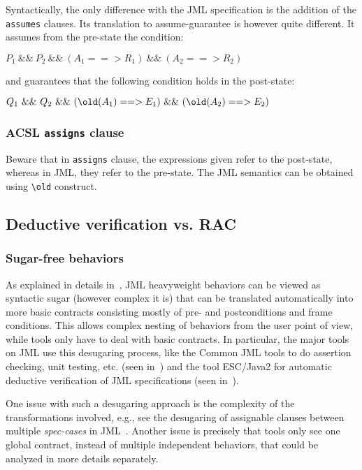 \noindent
Syntactically, the only difference with the JML specification is the
addition of the \verb|assumes| clauses.
Its translation to assume-guarantee is however quite different. 
It assumes from the pre-state the condition:

\begin{center}
{\ttfamily $P_1 ~\&\&~ P_2 ~\&\&~ 
  (A_1 ==> R_1) ~\&\&~ (A_2 ==> R_2)$}
\end{center}

\noindent
and guarantees that the following condition holds in the post-state:

\begin{center}
{\ttfamily $Q_1 ~\&\&~ Q_2 ~\&\&~ 
  (\texttt{{\textbackslash}old}(A_1) ==> E_1) ~\&\&~ (\texttt{{\textbackslash}old}(A_2) ==> E_2)$}
\end{center}

\subsubsection*{ACSL \texttt{assigns} clause}

Beware that in \texttt{assigns} clause, the expressions given refer to
the post-state, whereas in JML, they refer to the pre-state. The JML
semantics can be obtained using \verb|\old| construct.

\subsection{Deductive verification vs. RAC}

\subsubsection*{Sugar-free behaviors}

As explained in details in~\cite{raghavan00desugaring}, JML
heavyweight behaviors can be viewed as syntactic sugar (however
complex it is) that can be translated automatically into more basic
contracts consisting mostly of pre- and postconditions and frame
conditions.  This allows complex nesting of behaviors from the user
point of view, while tools only have to deal with basic contracts. In
particular, the major tools on JML use this desugaring process, like
the Common JML tools to do assertion checking, unit testing,
etc. (seen in~\cite{leavens00jml}) and the tool ESC/Java2 for
automatic deductive verification of JML specifications (seen
in~\cite{kiriny07implnotes}).

One issue with such a desugaring approach is the complexity of the
transformations involved, e.g., see the desugaring of assignable clauses
between multiple \textit{spec-cases} in
JML~\cite{raghavan00desugaring}.  Another issue is precisely that
tools only see one global contract, instead of multiple independent
behaviors, that could be analyzed in more details separately.

